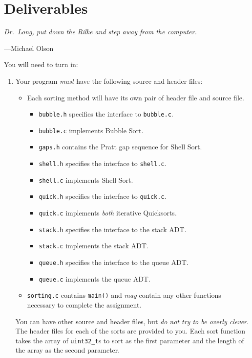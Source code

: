 \documentclass[11pt]{article}
\begin{document}
\section{Deliverables}

\epigraph{\emph{Dr.\ Long, put down the Rilke and step away from the
computer.}}{---Michael Olson}

You will need to turn in:

\begin{enumerate}
  \item Your program \emph{must} have the following source and header files:
  \begin{itemize}
    \item Each sorting method will have its own pair of header file and source file.
    \begin{itemize}
      \item \texttt{bubble.h} specifies the interface to \texttt{bubble.c}.
      \item \texttt{bubble.c} implements Bubble Sort.
      \item \texttt{gaps.h} contains the Pratt gap sequence for Shell
        Sort.
      \item \texttt{shell.h} specifies the interface to \texttt{shell.c}.
      \item \texttt{shell.c} implements Shell Sort.
      \item \texttt{quick.h} specifies the interface to \texttt{quick.c}.
      \item \texttt{quick.c} implements \emph{both} iterative Quicksorts.
      \item \texttt{stack.h} specifies the interface to the stack ADT.
      \item \texttt{stack.c} implements the stack ADT.
      \item \texttt{queue.h} specifies the interface to the queue ADT.
      \item \texttt{queue.c} implements the queue ADT.
    \end{itemize}
    \item \texttt{sorting.c} contains \texttt{main()} and \emph{may}
      contain any other functions necessary to complete the assignment.
  \end{itemize}

You can have other source and header files, but \emph{do not try to be
overly clever}. The header files for each of the sorts are provided to
you. Each sort function takes the array of \texttt{uint32\_t}s to sort
as the first parameter and the length of the array as the second
parameter.


\end{enumerate}
\end{document}
